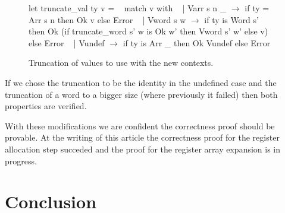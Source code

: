 \documentclass{article}
\begin{document}
\begin{figure}[t]
\obeylines\obeyspaces\ttfamily%
let truncate\_val ty v =
~ match v with
~ | Varr s n \_ \(\rightarrow\) if ty = Arr s n then Ok v else Error
~ | Vword s w \(\rightarrow\) if ty is Word s'
~   then Ok (if truncate\_word s' w is Ok w' then Vword s' w' else v) else Error
~ | Vundef \(\rightarrow\) if ty is Arr \_ then Ok Vundef else Error
\normalfont%
\caption{Truncation of values to use with the new contexts.}
\end{figure}

If we chose the truncation to be the identity in the undefined case and the
truncation of a word to a bigger size (where previously it failed) then both
properties are verified.

\medskip

With these modifications we are confident the correctness proof should be
provable. At the writing of this article the correctness proof for the register
allocation step succeded and the proof for the register array expansion is in
progress.

\section{Conclusion}\label{sec:ccl}
\end{document}

